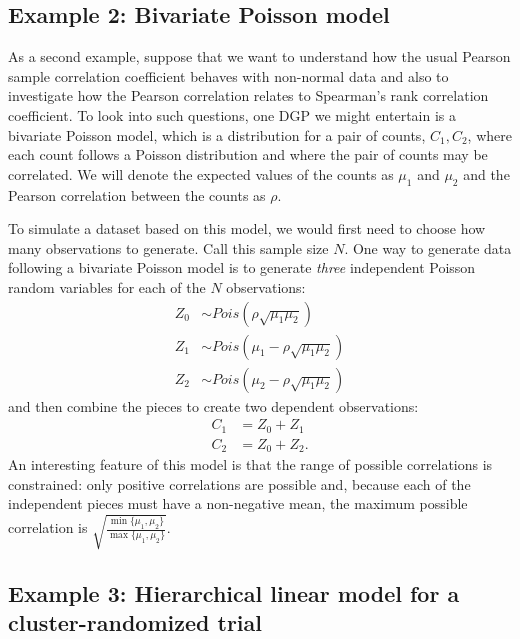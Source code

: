 \documentclass[
]{book}
\begin{document}
\subsection{Example 2: Bivariate Poisson model}\label{BVPois-example}

As a second example, suppose that we want to understand how the usual Pearson sample correlation coefficient behaves with non-normal data and also to investigate how the Pearson correlation relates to Spearman's rank correlation coefficient.
To look into such questions, one DGP we might entertain is a bivariate Poisson model, which is a distribution for a pair of counts, \(C_1,C_2\), where each count follows a Poisson distribution and where the pair of counts may be correlated.
We will denote the expected values of the counts as \(\mu_1\) and \(\mu_2\) and the Pearson correlation between the counts as \(\rho\).

To simulate a dataset based on this model, we would first need to choose how many observations to generate. Call this sample size \(N\).
One way to generate data following a bivariate Poisson model is to generate \emph{three} independent Poisson random variables for each of the \(N\) observations:
\[
\begin{aligned}
Z_0 &\sim Pois\left( \rho \sqrt{\mu_1 \mu_2}\right) \\
Z_1 &\sim Pois\left(\mu_1 - \rho \sqrt{\mu_1 \mu_2}\right) \\
Z_2 &\sim Pois\left(\mu_2 - \rho \sqrt{\mu_1 \mu_2}\right)
\end{aligned}
\]
and then combine the pieces to create two dependent observations:
\[
\begin{aligned}
C_1 &= Z_0 + Z_1 \\
C_2 &= Z_0 + Z_2.
\end{aligned}
\]
An interesting feature of this model is that the range of possible correlations is constrained: only positive correlations are possible and, because each of the independent pieces must have a non-negative mean, the maximum possible correlation is \(\sqrt{\frac{\min\{\mu_1,\mu_2\}}{\max\{\mu_1,\mu_2\}}}\).

\subsection{Example 3: Hierarchical linear model for a cluster-randomized trial}\label{CRT-example}
\end{document}
